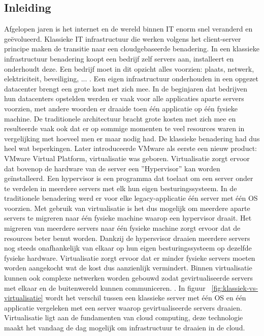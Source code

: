 \subsection{Inleiding}
Afgelopen jaren is het internet en de wereld binnen IT enorm snel veranderd en geëvolueerd. Klassieke IT infrastructuur die werken volgens het client-server principe maken de transitie naar een cloudgebaseerde benadering. In een klassieke infrastructuur benadering koopt een bedrijf zelf servers aan, installeert en onderhoudt deze. Een bedrijf moet in dit opzicht alles voorzien: plaats, netwerk, elektriciteit, beveiliging, ... . Een eigen infrastructuur onderhouden in een opgezet datacenter brengt een grote kost met zich mee. In de beginjaren dat bedrijven hun datacenters opstelden werden er vaak voor alle applicaties aparte servers voorzien, met andere woorden er draaide toen één applicatie op één fysieke machine. De traditionele architectuur bracht grote kosten met zich mee en resulteerde vaak ook dat er op sommige momenten te veel resources waren in vergelijking met hoeveel men er maar nodig had. De klassieke benadering had dus heel wat beperkingen. 
\newline
\newline
Later introduceerde VMware als eerste een nieuw product: VMware Virtual Platform, virtualisatie was geboren. Virtualisatie zorgt ervoor dat bovenop de hardware van de server een ''Hypervisor'' kan worden geïnstalleerd. Een hypervisor is een programma dat toelaat om een server onder te verdelen in meerdere servers met elk hun eigen besturingssysteem. In de traditionele benadering werd er voor elke legacy-applicatie één server met één OS voorzien. Met gebruik van virtualisatie is het dus mogelijk om meerdere aparte servers te migreren naar één fysieke machine waarop een hypervisor draait. Het migreren van meerdere servers naar één fysieke machine zorgt ervoor dat de resources beter benut worden. Dankzij de hypersvisor draaien meerdere servers nog steeds onafhankelijk van elkaar op hun eigen besturingssysteem op dezelfde fysieke hardware. Virtualisatie zorgt ervoor dat er minder fysieke servers  moeten worden aangekocht wat de kost dus aanzienlijk vermindert. Binnen virtualisatie kunnen ook complexe netwerken worden gebouwd zodat gevirtualiseerde servers met elkaar en de buitenwereld kunnen communiceren. \autocite{RedHat2019}. In 
figuur ~\ref{fig:klassiek-vs-virtualisatie} wordt het verschil tussen een klassieke server met één OS en één applicatie vergeleken met een server waarop gevirtualiseerde servers draaien. Virtualisatie ligt aan de fundamenten van cloud computing, deze technologie maakt het vandaag de dag mogelijk om infrastructuur te draaien in de cloud.
